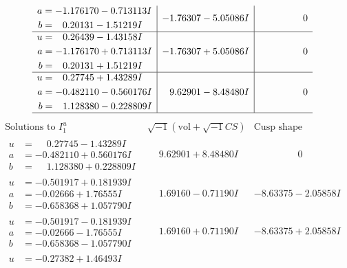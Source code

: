 \documentclass[1p]{elsarticle_modified}
\theoremstyle{definition}
\newcommand{\I}{\sqrt{-1}}
\begin{document}
$$\begin{array}{c|c|c}
\begin{aligned}
a &= -1.176170 - 0.713113 I \\
b &= \phantom{-}0.20131 - 1.51219 I\end{aligned}
 & -1.76307 - 5.05086 I & \phantom{-0.000000 } 0 \\ \hline\begin{aligned}
u &= \phantom{-}0.26439 - 1.43158 I \\
a &= -1.176170 + 0.713113 I \\
b &= \phantom{-}0.20131 + 1.51219 I\end{aligned}
 & -1.76307 + 5.05086 I & \phantom{-0.000000 } 0 \\ \hline\begin{aligned}
u &= \phantom{-}0.27745 + 1.43289 I \\
a &= -0.482110 - 0.560176 I \\
b &= \phantom{-}1.128380 - 0.228809 I\end{aligned}
 & \phantom{-}9.62901 - 8.48480 I & \phantom{-0.000000 } 0\\
 \hline 
 \end{array}$$\newpage$$\begin{array}{c|c|c}  
\text{Solutions to }I^u_{1}& \I (\text{vol} + \sqrt{-1}CS) & \text{Cusp shape}\\
 \hline 
\begin{aligned}
u &= \phantom{-}0.27745 - 1.43289 I \\
a &= -0.482110 + 0.560176 I \\
b &= \phantom{-}1.128380 + 0.228809 I\end{aligned}
 & \phantom{-}9.62901 + 8.48480 I & \phantom{-0.000000 } 0 \\ \hline\begin{aligned}
u &= -0.501917 + 0.181939 I \\
a &= -0.02666 + 1.76555 I \\
b &= -0.658368 + 1.057790 I\end{aligned}
 & \phantom{-}1.69160 - 0.71190 I & -8.63375 - 2.05858 I \\ \hline\begin{aligned}
u &= -0.501917 - 0.181939 I \\
a &= -0.02666 - 1.76555 I \\
b &= -0.658368 - 1.057790 I\end{aligned}
 & \phantom{-}1.69160 + 0.71190 I & -8.63375 + 2.05858 I \\ \hline\begin{aligned}
u &= -0.27382 + 1.46493 I \\

\end{aligned}
\end{array}$$
\end{document}
